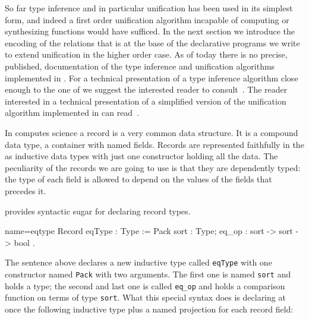 So far type inference and in particular unification has been used in
its simplest form, and indeed a first order unification algorithm
incapable of computing or synthesizing functions would have sufficed.
In the next section we introduce the encoding of the relations that
is at the base of the declarative programs we write to
extend unification in the higher order case.
As of today there is no precise, published, documentation of the type
inference and unification algorithms implemented in \Coq{}.  For a
technical presentation of a type inference algorithm close enough to
the one of \Coq{} we suggest the interested reader to
consult~\cite{DBLP:journals/corr/abs-1202-4905}.  The reader
interested in a technical presentation of a simplified version of the
unification algorithm implemented in \Coq{} can
read~\cite{unifcoq,betaderekjournal}.

\mcbREQUIRE{}
\mcbNOTES{}
\label{sec:eqtype}

In computes science a record is a very common data structure.  It is a
compound data type, a container with named fields.  Records are
represented faithfully in the \mcbCIC{} as
inductive data types with just one constructor holding all the data.
The peculiarity of the records we are going to use is that they are
dependently typed: the type of each field is allowed to depend on
the values of the fields that precedes it.

\Coq{} provides syntactic sugar for declaring record types.

\begin{coq}{name=eqtype}{}
Record eqType : Type := Pack {
  sort : Type;
  eq_op : sort -> sort -> bool
}.
\end{coq}
\label{eqtype:noproof}

The sentence above declares a new inductive type called
\lstinline/eqType/ with one constructor named
\lstinline/Pack/ with two arguments.  The first one
is named \lstinline/sort/ and holds a type; the second and last
one is called \lstinline/eq_op/ and holds a comparison function
on terms of type \lstinline/sort/.  What this special syntax
does is declaring at once the following inductive type plus
a named projection for each record field:

